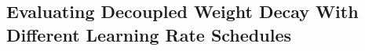 \documentclass[usenames,dvipsnames]{article} %
\begin{document}


%





\subsection{Evaluating Decoupled Weight Decay With Different Learning Rate Schedules}
\end{document}
